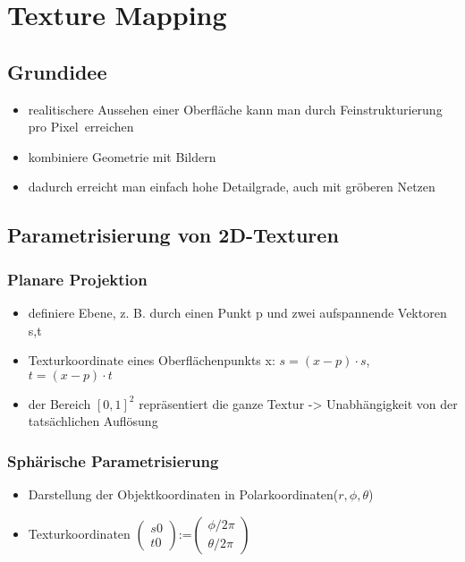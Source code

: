 \documentclass[paper=a4, fontsize=11pt]{scrartcl} %
\numberwithin{equation}{section} %
\numberwithin{figure}{section} %
\numberwithin{table}{section} %
\begin{document}
\section{Texture Mapping}

\subsection{Grundidee}

\begin{itemize}
\item realitischere Aussehen einer Oberfläche kann man durch \glqq Feinstrukturierung pro Pixel\grqq\ erreichen
\item kombiniere Geometrie mit Bildern
\item dadurch erreicht man einfach hohe Detailgrade, auch mit gröberen Netzen
\end{itemize}

\subsection{Parametrisierung von 2D-Texturen}

\subsubsection{Planare Projektion}

\begin{itemize}
\item definiere Ebene, z. B. durch einen Punkt p und zwei aufspannende Vektoren s,t
\item Texturkoordinate eines Oberflächenpunkts x: $s = (x-p) \cdot s$, $t = (x-p) \cdot t$
\item der Bereich $[0,1]^2$ repräsentiert die ganze Textur -> Unabhängigkeit von der tatsächlichen Auflösung
\end{itemize}

\subsubsection{Sphärische Parametrisierung}

\begin{itemize}
\item Darstellung der Objektkoordinaten in Polarkoordinaten($r,\phi,\theta$)
\item Texturkoordinaten $\left(
   \begin{array}{c}
     s 0\\
     t 0
   	\end{array}
	\right)
 $:=$ \left(
 	\begin{array}{c}
     \phi /2\pi\\
     \theta /2\pi
   \end{array}
	\right)$
\end{itemize}
\end{document}
